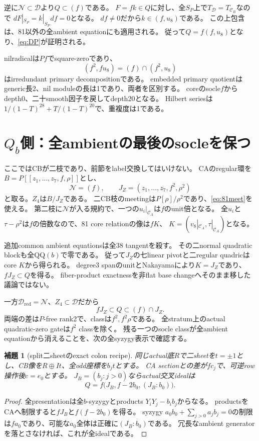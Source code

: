 \documentclass[11pt,a4paper]{ltjsarticle}
\newcommand{\CA}{\mathcal C_A}
\newcommand{\CB}{\mathcal C_B}
\newcommand{\cN}{\mathcal N}
\newcommand{\cD}{\mathcal D}
\newtheorem{lemma}[theorem]{補題}
\theoremstyle{definition}
\theoremstyle{remark}
\begin{document}
逆に$\cN\subset\cD$より$Q\subset(f)$である。
$F=fk\in Q$に対し、全$S_P$上で$T_{\cD}=T_{\CB}$なので
$dF|_{S_P}=k|_{S_P}df=0$となる。
$df\ne0$だから$k\in(f,u_8)$である。
この上包含は、81以外の全ambient equationにも適用される。
従って$Q=f(f,u_8)$となり、\eqref{eq:DP}が証明される。

nilradicalは$P f$でsquare-zeroであり、
\[
 (f^2,fu_8)=(f)\cap(f^2,u_8)
\]
はirredundant primary decompositionである。
embedded primary quotientはgeneric長2、nil moduleの長は1であり、両者を区別する。
coreのsocle$f$からdepth0、二十smooth因子を戻してdepth20となる。
Hilbert seriesは$1/(1-T)^{28}+T/(1-T)^{20}$で、重複度は1である。

\section{\texorpdfstring{$Q_b$}{Qb}側：全ambientの最後のsocleを保つ}

ここではCBが二枝であり、前節をlabel交換してはいけない。
CAのregular環を$B=P[[z_1,\ldots,z_7,f,\rho]]$とし、
\[
 \cN=(f),\qquad J_Z=(z_1,\ldots,z_7,f^2,\rho^2)
\]
と取る。$Z_4$は$B/J_Z$である。
二CB枝のmeetingは$P[\rho]/\rho^2$であり、\eqref{eq:81meet}を使える。
第二枝に$\cN$が入る規約で、一つの$u_i|_{\CA}$は$f$のunit倍となる。
全$u_i$と$\tau-\rho^2$は$f$の倍数なので、81 core relationの像は$fK$、
$K=(v_8|_{\CA},\tau|_{\CA})$となる。

追加common ambient equationsは全38 tangentを殺す。
その二normal quadratic blockも全QQ$(b)$で零である。
従って$J_Z$の七linear pivotと二regular quadricはcore $K$から得られる。
degree3 spanのunitとNakayamaにより$K=J_Z$であり、$fJ_Z\subset Q$を得る。
fiber-product exactnessを非flat base changeへそのまま移した議論ではない。

一方$\cD_{\mathrm{red}}=\cN$、$Z_4\subset\cD$だから
\begin{equation}\label{eq:sandwich}
 fJ_Z\subset Q\subset(f)\cap J_Z.
\end{equation}
両端の差は$P$-free rank2で、classは$f^2,f^2\rho$である。
全stratum上のactual quadratic-zero gateは$f^2$ classを除く。
残る一つのsocle classが全ambient equationから消えることを、次の全syzygy表示で確認する。

\begin{lemma}[split二sheetのexact colon recipe]\label{lem:colon}
同じactual底$R$で二sheetを$t=\pm1$とし、CB像を$R\oplus It$、全odd座標を$b_jt$とする。
CA sectionとの差が$f c_j$で、可逆row操作後$c=e_0$とする。
$J_B=(b_j:j>0)$ならactual交叉idealは
\[
 Q=f\bigl(J_B,f-2b_0,(J_B:b_0)\bigr).
\]
\end{lemma}
\begin{proof}
全presentationは全$b$-syzygyとproducts $Y_iY_j-b_ib_j$からなる。
productsをCAへ制限すると$fJ_B$と$f(f-2b_0)$を得る。
syzygy $a_0b_0+\sum_{j>0}a_jb_j=0$の制限は$fa_0$であり、可能な$a_0$全体は正確に$(J_B:b_0)$である。
冗長なambient generatorを落とさなければ、これが全idealである。
\end{proof}
\end{document}
